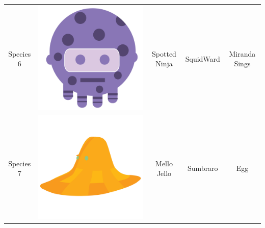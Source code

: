 \begin{table}
\begin{tabular}{ | c | c | c | c | c | }
Species 6  & \includegraphics[valign=m,scale=0.1]{images/species_06.png} & Spotted Ninja & SquidWard & Miranda Sings \\ 
Species 7  & \includegraphics[valign=m,scale=0.1]{images/species_07.png} & Mello Jello & Sumbraro & Egg \\ 

\end{tabular}
\end{table}
